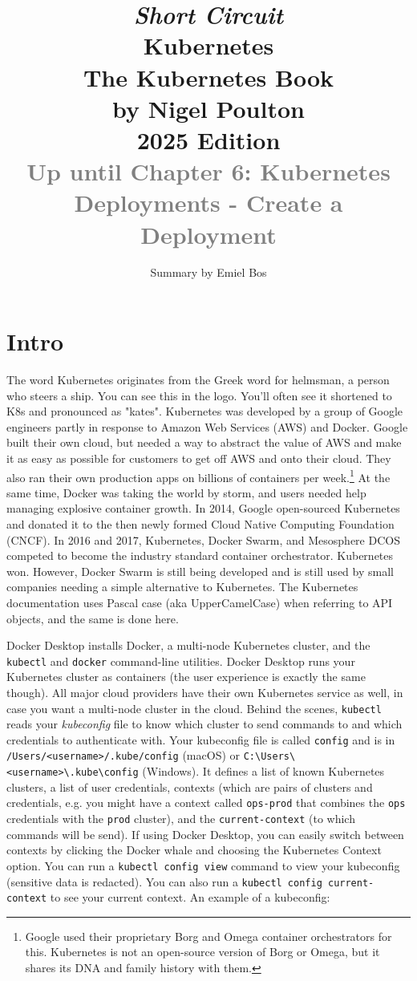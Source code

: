 \documentclass[8pt, table, xcdraw]{article}%
\title{
\textit{Short Circuit}\\
\vspace{15px}
\huge
Kubernetes\\
\vspace{20px}
\large
The Kubernetes Book\\
by Nigel Poulton\\
2025 Edition\\
\textcolor{gray}{Up until Chapter 6: Kubernetes Deployments - Create a Deployment}
}
\author{Summary by Emiel Bos}
\date{}
\begin{document}
\maketitle

\section{Intro}

The word Kubernetes originates from the Greek word for helmsman, a person who steers a ship. You can see this in the logo. You’ll often see it shortened to K8s and pronounced as "kates".
Kubernetes was developed by a group of Google engineers partly in response to Amazon Web Services (AWS) and Docker. Google built their own cloud, but needed a way to abstract the value of AWS and make it as easy as possible for customers to get off AWS and onto their cloud. They also ran their own production apps on billions of containers per week.\footnote{Google used their proprietary Borg and Omega container orchestrators for this. Kubernetes is not an open-source version of Borg or Omega, but it shares its DNA and family history with them.} At the same time, Docker was taking the world by storm, and users needed help managing explosive container growth. In 2014, Google open-sourced Kubernetes and donated it to the then newly formed Cloud Native Computing Foundation (CNCF).
In 2016 and 2017, Kubernetes, Docker Swarm, and Mesosphere DCOS competed to become the industry standard container orchestrator. Kubernetes won. However, Docker Swarm is still being developed and is still used by small companies needing a simple alternative to Kubernetes.
The Kubernetes documentation uses Pascal case (aka UpperCamelCase) when referring to API objects, and the same is done here.

Docker Desktop installs Docker, a multi-node Kubernetes cluster, and the \lstinline{kubectl} and \lstinline{docker} command-line utilities. Docker Desktop runs your Kubernetes cluster as containers (the user experience is exactly the same though). All major cloud providers have their own Kubernetes service as well, in case you want a multi-node cluster in the cloud. Behind the scenes, \lstinline{kubectl} reads your \emph{kubeconfig} file to know which cluster to send commands to and which credentials to authenticate with. Your kubeconfig file is called \lstinline{config} and is in \lstinline{/Users/<username>/.kube/config} (macOS) or \lstinline{C:\Users\<username>\.kube\config} (Windows). It defines a list of known Kubernetes clusters, a list of user credentials, contexts (which are pairs of clusters and credentials, e.g. you might have a context called \lstinline{ops-prod} that combines the \lstinline{ops} credentials with the \lstinline{prod} cluster), and the \lstinline{current-context}  (to which commands will be send). If using Docker Desktop, you can easily switch between contexts by clicking the
Docker whale and choosing the Kubernetes Context option. You can run a \lstinline{kubectl config view} command to view your kubeconfig (sensitive data is redacted). You can also run a \lstinline{kubectl config current-context} to see your current context. An example of a kubeconfig:
\end{document}
